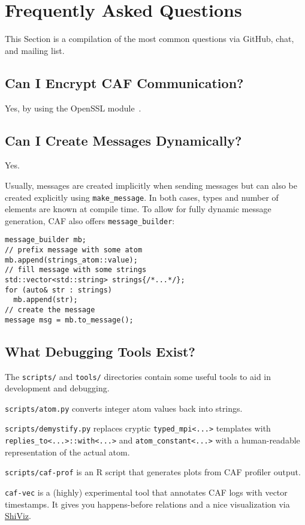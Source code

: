 \section{Frequently Asked Questions}
\label{faq}

This Section is a compilation of the most common questions via GitHub, chat,
and mailing list.

\subsection{Can I Encrypt CAF Communication?}

Yes, by using the OpenSSL module~.

\subsection{Can I Create Messages Dynamically?}

Yes.

Usually, messages are created implicitly when sending messages but can also be
created explicitly using \lstinline^make_message^. In both cases, types and
number of elements are known at compile time. To allow for fully dynamic
message generation, CAF also offers \lstinline^message_builder^:

\begin{lstlisting}
message_builder mb;
// prefix message with some atom
mb.append(strings_atom::value);
// fill message with some strings
std::vector<std::string> strings{/*...*/};
for (auto& str : strings)
  mb.append(str);
// create the message
message msg = mb.to_message();
\end{lstlisting}

\subsection{What Debugging Tools Exist?}

The \lstinline^scripts/^ and \lstinline^tools/^ directories contain some useful
tools to aid in development and debugging.

\lstinline^scripts/atom.py^ converts integer atom values back into strings.

\lstinline^scripts/demystify.py^ replaces cryptic \lstinline^typed_mpi<...>^
templates with \lstinline^replies_to<...>::with<...>^ and
\lstinline^atom_constant<...>^ with a human-readable representation of the
actual atom.

\lstinline^scripts/caf-prof^ is an R script that generates plots from CAF
profiler output.

\lstinline^caf-vec^ is a (highly) experimental tool that annotates CAF logs
with vector timestamps. It gives you happens-before relations and a nice
visualization via \href{https://bestchai.bitbucket.io/shiviz/}{ShiViz}.

